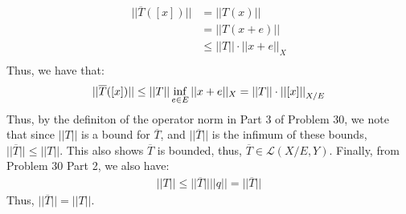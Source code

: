 \documentclass[12pt]{article}
\begin{document}
\begin{solution}
    \begin{align*}
        ||\overline{T}([x])|| &= ||T(x)|| \\
        &= ||T(x+e)|| \\
        &\leq ||T|| \cdot ||x+e||_X \\
    \end{align*}
    Thus, we have that: 
    \[||\overline{T}([x])|| \leq ||T|| \inf_{e\in E} ||x+e||_X = ||T||\cdot \left\vert\left\vert[x]\right\vert\right\vert_{X/E}\]
    Thus, by the definiton of the operator norm in Part 3 of Problem 30, we note that since $||T||$ is a bound for $\overline{T}$, and $||\overline{T}||$ is the infimum of these bounds, $||\overline{T}|| \leq ||T||$. This also shows $\overline{T}$ is bounded, thus, $\overline{T} \in \mathcal{L}(X/E, Y)$. Finally, from Problem 30 Part 2, we also have:
    \begin{align*}
        ||T|| \leq ||\overline{T}||||q|| = ||\overline{T}||
    \end{align*}
    Thus, $||\overline{T}|| = ||T||$. 
\end{solution}
\newpage 
\end{document}
